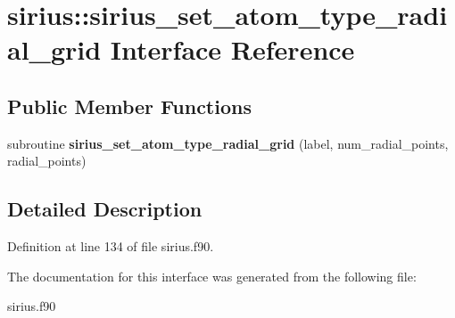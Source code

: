 \hypertarget{interfacesirius_1_1sirius__set__atom__type__radial__grid}{}\section{sirius\+:\+:sirius\+\_\+set\+\_\+atom\+\_\+type\+\_\+radial\+\_\+grid Interface Reference}
\label{interfacesirius_1_1sirius__set__atom__type__radial__grid}
\subsection*{Public Member Functions}
\begin{DoxyCompactItemize}
\item 
\hypertarget{interfacesirius_1_1sirius__set__atom__type__radial__grid_a1f3669ca681278bcad33c35ada5834d9}{}subroutine {\bfseries sirius\+\_\+set\+\_\+atom\+\_\+type\+\_\+radial\+\_\+grid} (label, num\+\_\+radial\+\_\+points, radial\+\_\+points)\label{interfacesirius_1_1sirius__set__atom__type__radial__grid_a1f3669ca681278bcad33c35ada5834d9}

\end{DoxyCompactItemize}


\subsection{Detailed Description}


Definition at line 134 of file sirius.\+f90.



The documentation for this interface was generated from the following file\+:\begin{DoxyCompactItemize}
\item 
sirius.\+f90\end{DoxyCompactItemize}
